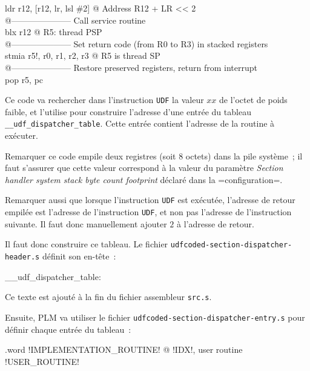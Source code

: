 \begin{SHELL}
\hspace*{1.2em}ldr   r12, [r12, lr, lsl \#2]   @ Address R12 + LR << 2\\
@--------------------- Call service routine\\
\hspace*{1.2em}blx   r12                      @ R5: thread PSP\\
@--------------------- Set return code (from R0 to R3) in stacked registers\\
\hspace*{1.2em}stmia r5!, {r0, r1, r2, r3}    @ R5 is thread SP\\
@--------------------- Restore preserved registers, return from interrupt\\
\hspace*{1.2em}pop   {r5, pc}
\end{SHELL}

Ce code va rechercher dans l'instruction \texttt{UDF} la valeur $xx$ de l'octet de poids faible, et l'utilise pour construire l'adresse d'une entrée du tableau \texttt{\_\_udf\_dispatcher\_table}. Cette entrée contient l'adresse de la routine à exécuter.

Remarquer ce code empile deux registres (soit 8 octets) dans la pile système~; il faut s'assurer que cette valeur correspond à la valeur du paramètre \emph{Section handler system stack byte count footprint} déclaré dans la \plm=configuration=.

Remarquer aussi que lorsque l'instruction \texttt{UDF} est exécutée, l'adresse de retour empilée est l'adresse de l'instruction \texttt{UDF}, et non pas l'adresse de l'instruction suivante. Il faut donc manuellement ajouter $2$ à l'adresse de retour.

Il faut donc construire ce tableau. Le fichier \texttt{udfcoded-section-dispatcher-header.s} définit son en-tête~:

\begin{SHELL}\small
\_\_udf\_dispatcher\_table:
\end{SHELL}

Ce texte est ajouté à la fin du fichier assembleur \texttt{src.s}.

Ensuite, PLM va utiliser le fichier \texttt{udfcoded-section-dispatcher-entry.s} pour définir chaque entrée du tableau~:
\begin{SHELL}\small
\hspace*{1.2em}.word !IMPLEMENTATION\_ROUTINE! @ !IDX!, user routine !USER\_ROUTINE!

\end{SHELL}


